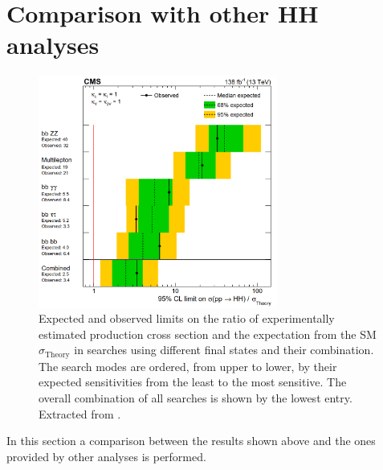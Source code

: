 \documentclass[../main.tex]{subfiles}
\begin{document}
\section{Comparison with other HH analyses}
\label{hh:sec:comparison}

\begin{figure}[h!]
\begin{center}
\includegraphics[width=0.7\textwidth]{Images/CMS-HIG-22-001_Figure_005-a}
\end{center}
\caption[CMS HH production cross section results]{Expected and observed limits on the ratio of experimentally estimated production cross section and the expectation from the SM $\sigma_{\text{Theory}}$ in searches using different final states and their combination. The search modes are ordered, from upper to lower, by their expected sensitivities from the least to the most sensitive. The overall combination of all searches is shown by the lowest entry. Extracted from \cite{hh:analysis:nature}.}
\label{hh:fig:lim_comb}
\end{figure}

In this section a comparison between the results shown above and the ones provided by other analyses is performed.
\end{document}
